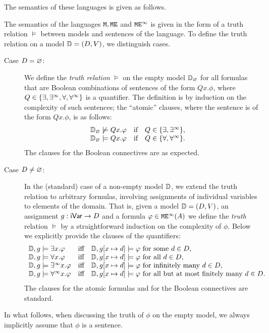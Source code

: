 \noindent

The semantics of these languages is given as follows. 

\begin{definition}
The semantics of the languages $\mathtt{M}, \mathtt{M}\mathtt{E}$ and $\mathtt{M}\mathtt{E}^{\infty}$ is given in the form
of a truth relation $\models$ between models and sentences of the language.
To define the truth relation on a model $\mathbb{D} = (D ,V)$, we distinguish 
cases.


\begin{description}
\item[Case $D=\varnothing$:] 
We define the \emph{truth relation} $\models$ on the empty model ${\mathbb{D}_\varnothing}$ for
all formulas that are Boolean combinations of sentences of the form $Qx. \phi$,
where $Q \in \{ \exists, \exists^\infty, \forall, \forall^\infty \}$ is a quantifier.
The definition is by induction on the complexity of such sentences; the 
``atomic'' clauses, where the sentence is of the form $Qx. \phi$, is as follows:
\[\begin{array}{lll}
 {\mathbb{D}_\varnothing} \not\models Qx. \varphi 
   & \text{if}\quad Q \in \{ \exists,  \exists^\infty \},&
\\   
{\mathbb{D}_\varnothing} \models Qx. \varphi 
   & \text{if}\quad Q \in \{ \forall,  \forall^\infty \}.&
\end{array}\]
The clauses for the Boolean connectives are as expected.

\item[Case $D \neq \varnothing$:] 
In the (standard) case of a non-empty model $\mathbb{D}$, we extend the truth 
relation to arbitrary formulas, involving assignments of individual variables 
to elements of the domain.
That is, given a model $\mathbb{D} = (D,V)$, an assignment $g :\mathsf{iVar}\to D$ and 
a formula $\varphi \in \mathtt{M}\mathtt{E}^{\infty}(A)$ we define the \emph{truth} relation $\models$ 
by a straightforward induction on the complexity of $\phi$.
Below we explicitly provide the clauses of the quantifiers:
%
\[\begin{array}{lll}
   \mathbb{D},g \models \exists x.\varphi 
   & \text{iff}\quad \mathbb{D},g [x\mapsto d] \models \varphi 
     \text{ for some $d\in D$},
\\   \mathbb{D},g \models \forall x.\varphi 
   & \text{iff}\quad \mathbb{D},g [x\mapsto d] \models \varphi 
     \text{ for all $d\in D$},
\\   \mathbb{D},g \models \exists^\infty x.\varphi 
   & \text{iff}\quad \mathbb{D},g [x\mapsto d] \models \varphi 
     \text{ for infinitely many $d\in D$},
\\   \mathbb{D},g \models \forall^\infty x.\varphi 
   & \text{iff}\quad \mathbb{D},g [x\mapsto d] \models \varphi 
     \text{ for all but at most finitely many $d\in D$}.
\end{array}\]
The clauses for the atomic formulas and for the Boolean connectives are standard.
\end{description}
In what follows, when discussing the truth of $\phi$ on the empty model, we
always implicitly assume that $\phi$ is a sentence.
\end{definition}


